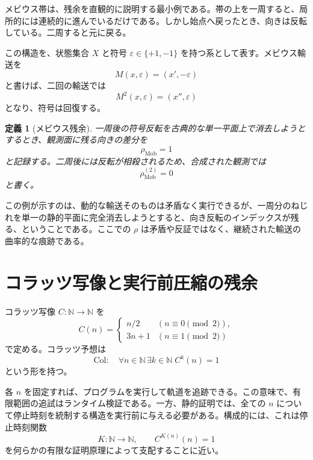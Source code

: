 \documentclass[11pt,a4paper,ja=standard,autodetect-engine]{bxjsarticle}
\newtheorem{definition}{定義}
\begin{document}
メビウス帯は、残余を直観的に説明する最小例である。帯の上を一周すると、局所的には連続的に進んでいるだけである。しかし始点へ戻ったとき、向きは反転している。二周すると元に戻る。

この構造を、状態集合 $X$ と符号 $\varepsilon\in\{+1,-1\}$ を持つ系として表す。メビウス輸送を
\begin{equation}
    M(x,\varepsilon)=(x',-\varepsilon)
\end{equation}
と書けば、二回の輸送では
\begin{equation}
    M^{2}(x,\varepsilon)=(x'',\varepsilon)
\end{equation}
となり、符号は回復する。

\begin{definition}[メビウス残余]
一周後の符号反転を古典的な単一平面上で消去しようとするとき、観測面に残る向きの差分を
\begin{equation}
    \rho_{\mathrm{Mob}}=1
\end{equation}
と記録する。二周後には反転が相殺されるため、合成された観測では
\begin{equation}
    \rho_{\mathrm{Mob}}^{(2)}=0
\end{equation}
と書く。
\end{definition}

この例が示すのは、動的な輸送そのものは矛盾なく実行できるが、一周分のねじれを単一の静的平面に完全消去しようとすると、向き反転のインデックスが残る、ということである。ここでの $\rho$ は矛盾や反証ではなく、継続された輸送の曲率的な痕跡である。

\section{コラッツ写像と実行前圧縮の残余}

コラッツ写像 $C:\mathbb{N}\to\mathbb{N}$ を
\begin{equation}
    C(n)=
    \begin{cases}
        n/2 & (n\equiv 0 \pmod 2),\\
        3n+1 & (n\equiv 1 \pmod 2)
    \end{cases}
\end{equation}
で定める。コラッツ予想は
\begin{equation}
    \mathrm{Col}:\quad \forall n\in\mathbb{N}\,\exists k\in\mathbb{N}\; C^{k}(n)=1
\end{equation}
という形を持つ。

各 $n$ を固定すれば、プログラムを実行して軌道を追跡できる。この意味で、有限範囲の追試はランタイム検証である。一方、静的証明では、全ての $n$ について停止時刻を統制する構造を実行前に与える必要がある。構成的には、これは停止時刻関数
\begin{equation}
    K:\mathbb{N}\to\mathbb{N},\qquad C^{K(n)}(n)=1
\end{equation}
を何らかの有限な証明原理によって支配することに近い。
\end{document}
